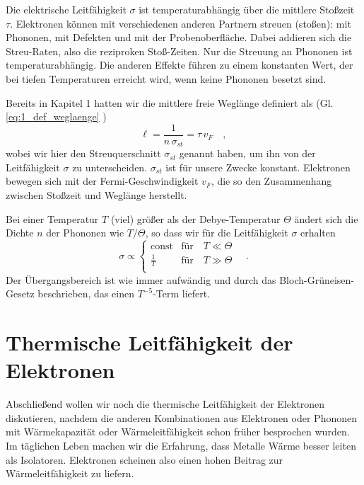 Die elektrische Leitfähigkeit $\sigma$ ist temperaturabhängig über die mittlere Stoßzeit $\tau$. Elektronen können mit verschiedenen anderen Partnern streuen (stoßen): mit Phononen, mit Defekten und mit der Probenoberfläche. Dabei addieren sich die Streu-Raten, also die reziproken Stoß-Zeiten. Nur die Streuung an Phononen ist temperaturabhängig. Die anderen Effekte führen zu einem konstanten Wert, der bei tiefen Temperaturen erreicht wird, wenn keine Phononen besetzt sind.

Bereits in Kapitel 1 hatten wir die mittlere freie Weglänge definiert als (Gl. \ref{eq:1_def_weglaenge} )
\begin{equation}
   \ell = \frac{1}{n \, \sigma_{st}} = \tau \, v_F \quad ,
\end{equation}
wobei wir hier den Streuquerschnitt $\sigma_{st}$ genannt haben, um ihn von der Leitfähigkeit $\sigma$ zu unterscheiden. $\sigma_{st}$ ist für unsere Zwecke konstant. Elektronen bewegen sich mit der Fermi-Geschwindigkeit $v_F$, die so den Zusammenhang zwischen Stoßzeit und Weglänge herstellt.

Bei einer Temperatur $T$ (viel) größer als der Debye-Temperatur $\Theta$ ändert sich die Dichte $n$ der Phononen wie $T/\Theta$, so dass wir für die Leitfähigkeit $\sigma$ erhalten
\begin{equation}
   \sigma \propto \left\{ 
      \begin{matrix}
         \text{const} & \text{für} \quad T \ll \Theta \\
   \frac{1}{T} &  \text{für} \quad T \gg \Theta \\
      \end{matrix}
   \right.  \quad .
\end{equation}
Der Übergangsbereich ist wie immer aufwändig und durch das Bloch-Grüneisen-Gesetz beschrieben, das einen $T^{-5}$-Term liefert.


\section{Thermische Leitfähigkeit der Elektronen}

Abschließend wollen wir noch die thermische Leitfähigkeit der Elektronen diskutieren, nachdem die anderen Kombinationen aus Elektronen oder Phononen mit Wärmekapazität oder Wärmeleitfähigkeit schon früher besprochen wurden. Im täglichen Leben machen wir die Erfahrung, dass Metalle Wärme besser leiten als Isolatoren. Elektronen scheinen also einen hohen Beitrag zur Wärmeleitfähigkeit zu liefern.

